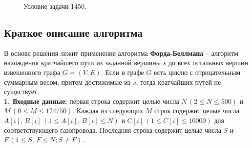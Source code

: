 \documentclass[a5paper, 10pt]{article}
\theoremstyle{definition}
\theoremstyle{plain}
\theoremstyle{remark}
\begin{document}
\begin{figure}[h!]
\caption{Условие задачи 1450.}
\end{figure}

\subsection{Краткое описание алгоритма}
В основе решения лежит применение алгоритма \textbf{Форда-Беллмана} -- алгоритм нахождения кратчайшего пути из заданной вершины $s$ до всех остальных вершин взвешенного графа $G = \left( V, E \right)$. Если в графе $G$ есть циклю с отрицательным суммарным весом, притом достижимые из $s$, тогда кратчайших путей не существует.\\

\textbf{1. Входные данные:} первая строка содержит целые числа $N \, (2 \leq N \leq 500)$ и $M \, (0 \leq M \leq 124750)$. Каждая из следующих $M$ строк содержит целые числа $A[i], \, B[i] \, (1 \leq A[i],\, B[i] \leq N)$ и $C[i] \, (1 \leq C[i] \leq 10000)$ для соответствующего газопровода. Последняя строка содержит целые числа $S$ и $F \, (1 \leq S,\, F \leq N; S \neq F)$.\\
\end{document}
